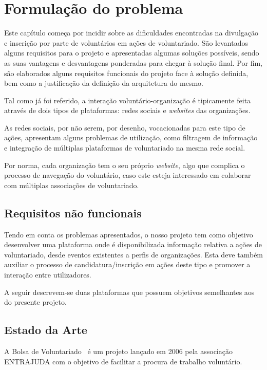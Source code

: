 \section{Formulação do problema}

Este capítulo começa por incidir sobre as dificuldades encontradas na divulgação e inscrição por parte de voluntários em ações de voluntariado. São levantados alguns requisitos para o projeto e apresentadas algumas soluções possíveis, sendo as suas vantagens e desvantagens ponderadas para chegar à solução final. Por fim, são elaborados alguns requisitos funcionais do projeto face à solução definida, bem como a justificação da definição da arquitetura do mesmo. \par \medskip

Tal como já foi referido, a interação voluntário-organização é tipicamente feita através de dois tipos de plataformas: redes sociais e \textit{websites} das organizações.  \medskip

As redes sociais, por não serem, por desenho, vocacionadas para este tipo de ações, apresentam alguns problemas de utilização, como filtragem de informação e integração de múltiplas plataformas de voluntariado na mesma rede social.  \medskip

Por norma, cada organização tem o seu próprio \textit{website}, algo que complica o processo de navegação do voluntário, caso este esteja interessado em colaborar com múltiplas associações de voluntariado. 

\subsection{Requisitos não funcionais}
Tendo em conta os problemas apresentados, o nosso projeto tem como objetivo desenvolver uma plataforma onde é disponibilizada informação relativa a ações de voluntariado, desde eventos existentes a perfis de organizações. Esta deve também auxiliar o processo de candidatura/inscrição em ações deste tipo e promover a interação entre utilizadores. \bigskip

A seguir descrevem-se duas plataformas que possuem objetivos semelhantes aos do presente projeto.

\subsection{Estado da Arte}

A Bolsa de Voluntariado~\cite{bolsa_voluntariado} é um projeto lançado em 2006 pela associação ENTRAJUDA com o objetivo de facilitar a procura de trabalho voluntário. \medskip

